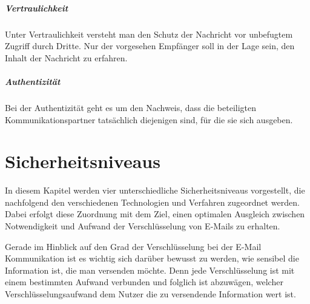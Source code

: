 \documentclass  [paper=a4,
				fontsize=12pt,
				listof=totoc,
				bibliography=totoc
				]{scrreprt}
\begin{document}
	\paragraph{Vertraulichkeit}
	
	Unter Vertraulichkeit versteht man den Schutz der Nachricht vor unbefugtem Zugriff durch Dritte. Nur der vorgesehen Empfänger soll in der Lage sein, den Inhalt der Nachricht zu erfahren.
	
	\paragraph{Authentizität}
	
	Bei der Authentizität geht es um den Nachweis, dass die beteiligten Kommunikationspartner tatsächlich diejenigen sind, für die sie sich ausgeben.
	
	\chapter{Sicherheitsniveaus}\label{chap:sicherheitsniveaus}
	
		In diesem Kapitel werden vier unterschiedliche Sicherheitsniveaus vorgestellt, die nachfolgend den verschiedenen Technologien und Verfahren zugeordnet werden.
		Dabei erfolgt diese Zuordnung mit dem Ziel, einen optimalen Ausgleich zwischen Notwendigkeit und Aufwand der Verschlüsselung von E-Mails zu erhalten.\medskip
		
	
	
		
		Gerade im Hinblick auf den Grad der Verschlüsselung bei der E-Mail Kommunikation ist es wichtig sich darüber bewusst zu werden, wie sensibel die Information ist, die man versenden möchte. Denn jede Verschlüsselung ist mit einem bestimmten Aufwand verbunden und folglich ist abzuwägen, welcher Verschlüsselungsaufwand dem Nutzer die zu versendende Information wert ist. 
		\medskip
		
\end{document}
